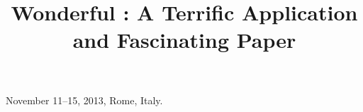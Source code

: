 


\date{}




\author{
}

\title{\Large \bf Wonderful : A Terrific Application and Fascinating Paper}

 {November 11--15, 2013, Rome, Italy.}

\maketitle




\balance




